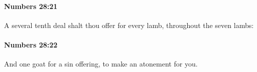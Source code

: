 		\paragraph{Numbers 28:21} %
			\label{NUMBERS-28-21}

			A several tenth deal shalt thou offer for every lamb, throughout the seven lambs:


		\paragraph{Numbers 28:22} %
			\label{NUMBERS-28-22}

			And one goat for a sin offering, to make an atonement for you.


